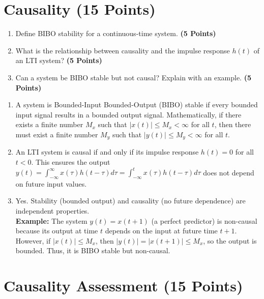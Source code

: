 \documentclass[12pt,xcolor=dvipsnames,svgnames,x11names]{article}
\begin{document}
\section{Causality (15 Points)}

\begin{enumerate}
\item Define BIBO stability for a continuous-time system. \textbf{(5 Points)}

\item What is the relationship between causality and the impulse response $h(t)$ of an LTI system? \textbf{(5 Points)}

\item Can a system be BIBO stable but not causal? Explain with an example. \textbf{(5 Points)}


\end{enumerate}

\begin{answerbox}

\begin{enumerate}

\item A system is Bounded-Input Bounded-Output (BIBO) stable if every bounded input signal results in a bounded output signal. Mathematically, if there exists a finite number $ M_x $ such that $ |x(t)| \leq M_x < \infty $ for all $ t $, then there must exist a finite number $ M_y $ such that $ |y(t)| \leq M_y < \infty $ for all $ t $.

\item An LTI system is causal if and only if its impulse response $ h(t) = 0 $ for all $ t < 0 $. This ensures the output $ y(t) = \int_{-\infty}^{\infty} x(\tau)h(t-\tau)d\tau = \int_{-\infty}^{t} x(\tau)h(t-\tau)d\tau $ does not depend on future input values.

\item Yes. Stability (bounded output) and causality (no future dependence) are independent properties. \\
\textbf{Example:} The system $ y(t) = x(t + 1) $ (a perfect predictor) is non-causal because its output at time $ t $ depends on the input at future time $ t+1 $. However, if $ |x(t)| \leq M_x $, then $ |y(t)| = |x(t+1)| \leq M_x $, so the output is bounded. Thus, it is BIBO stable but non-causal.
\end{enumerate}

\end{answerbox}

\section{Causality Assessment  (15 Points)}
\end{document}
